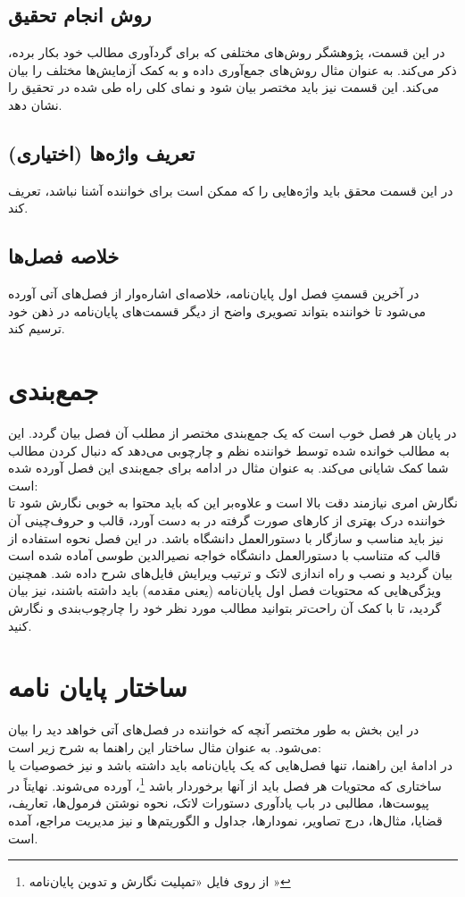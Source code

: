 \subsection{روش انجام تحقیق}
در این قسمت، پژوهشگر روش‌های مختلفی که برای گردآوری مطالب خود بکار برده، ذکر می‌کند. به عنوان مثال روش‌های جمع‌آوری داده و به کمک آزمایش‌ها مختلف را بیان می‌کند. این قسمت نیز باید مختصر بیان شود و نمای کلی راه طی شده در تحقیق را نشان دهد.

\subsection{تعریف واژه‌ها (اختیاری)}
در این قسمت محقق باید واژه‌هایی را که ممکن است برای خواننده آشنا نباشد، تعریف کند.

\subsection{خلاصه فصل‌ها}
در آخرین قسمتِ فصل اول پایان‌نامه، خلاصه‌ای اشاره‌وار از فصل‌های آتی آورده می‌شود تا خواننده بتواند تصویری واضح از دیگر قسمت‌های پایان‌نامه در ذهن خود ترسیم کند.

\section{جمع‌بندی}
در پایان هر فصل خوب است که یک جمع‌بندی مختصر از مطلب آن فصل بیان گردد. این به مطالب خوانده شده توسط خواننده نظم و چارچوبی می‌دهد که دنبال کردن مطالب شما کمک شایانی می‌کند.
به عنوان مثال در ادامه برای جمع‌بندی این فصل آورده شده است:\\
نگارش \پ امری نیازمند دقت بالا است و علاوه‌بر این که باید محتوا به خوبی نگارش شود تا خواننده درک بهتری از کار‌های صورت گرفته در \پ به دست آورد، قالب و حروف‌چینی آن نیز باید مناسب و سازگار با دستورالعمل دانشگاه باشد.  در این فصل نحوه استفاده از قالب \پ که متناسب با دستورالعمل دانشگاه خواجه نصیرالدین طوسی آماده شده است بیان گردید و نصب و راه اندازی لاتک و ترتیب ویرایش فایل‌های شرح داده شد. همچنین ویژگی‌هایی که محتویات فصل اول پایان‌نامه (یعنی مقدمه) باید داشته باشند، نیز بیان گردید، تا با کمک آن راحت‌تر بتوانید مطالب مورد نظر خود را چارچوب‌بندی و نگارش کنید.

\section{ساختار پایان نامه}
در این بخش به طور مختصر آنچه که خواننده در فصل‌های آتی خواهد دید را بیان می‌شود. به عنوان مثال ساختار این راهنما به شرح زیر است:\\
در ادامهٔ این راهنما، تنها فصل‌هایی که یک پایان‌نامه باید داشته باشد و نیز خصوصیات یا ساختاری که محتویات هر فصل باید از آنها برخوردار باشد%
\footnote{از روی فایل «تمپلیت نگارش و تدوین پایان‌نامه \cite{RN57}»}،
آورده می‌شوند. نهایتاً  در پیوست‌ها، مطالبی در باب یادآوری دستورات لاتک، نحوه نوشتن فرمول‌ها، تعاریف، قضایا، مثال‌ها، درج تصاویر، نمودارها، جداول و الگوریتم‌ها و نیز مدیریت مراجع، آمده است.
